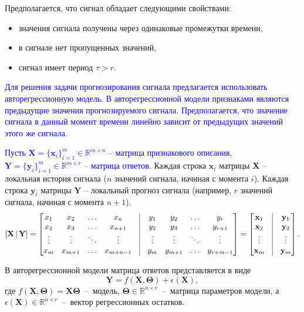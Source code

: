 \documentclass[12pt,twoside]{article}
\newcommand{\bx}{\mathbf{x}}
\newcommand{\by}{\mathbf{y}}
\newcommand{\bTheta}{\boldsymbol{\Theta}}
\begin{document}
Предполагается, что сигнал обладает следующими свойствами: 

\begin{itemize}
\item значения сигнала получены через одинаковые промежутки времени, 
\item в сигнале нет пропущенных значений,
\item сигнал имеет период $\tau > r$. 
\end{itemize}
\textcolor{blue}{Для решения задачи прогнозирования сигнала предлагается использовать авторегрессионную модель. 
В авторегрессионной модели признаками являются предыдущие значения прогнозируемого сигнала. Предполагается, что значение сигнала в данный момент времени линейно зависит от предыдущих значений этого же сигнала.} 

\textcolor{blue}{Пусть $\mathbf{X} = \{\bx_i\}_{i=1}^m \in \mathbb{R}^{m \times n}$ -- матрица признакового описания, $\mathbf{Y}= \{\by_i\}_{i=1}^m \in \mathbb{R}^{m \times r}$ -- матрица ответов.} Каждая строка $\bx_i$ матрицы $\mathbf{X}$ – локальная история сигнала ($n$ значений сигнала, начиная с момента $i$). Каждая строка $\by_i$ матрицы $\mathbf{Y}$ – локальный прогноз сигнала (например, $r$ значений сигнала, начиная с момента $n+1$).
$$\left[ \mathbf{X \, | \, Y} \right] = \begin{bmatrix}
        x_1 & x_2 & \dots  & x_{n} & \vrule & y_1 & y_2 & \dots  & y_{r}\\
        x_2 & x_3 & \dots & x_{n + 1} & \vrule & y_2 & y_3 & \dots  & y_{r+1}\\
        \vdots & \vdots & \ddots & \vdots & \vrule & \vdots & \vdots & \ddots & \vdots \\
        x_{m} & x_{m+1} & \dots  & x_{m+n-1} & \vrule & y_{m} & y_{m+1} & \dots  & y_{r+m-1}
    \end{bmatrix} = 
    \begin{bmatrix}
        \bx_1 & \vrule & \by_1\\
        \bx_2 &\vrule & \by_2\\
        \vdots & \vrule &  \vdots \\
        \bx_m & \vrule & \by_m
    \end{bmatrix}.
$$

В авторегрессионной модели матрица ответов представляется в виде $$\mathbf{Y} = f (\mathbf{X},  \bTheta) + \epsilon ( \mathbf{X} ), $$ 
где  $f (\mathbf{X},  \bTheta) = \mathbf{X} \bTheta$~--~модель, $\bTheta \in \mathbb{R}^{n \times r}$~--~матрица параметров модели, а~$\epsilon(\mathbf{X})\in \mathbb{R}^{n \times r}$~--~вектор регрессионных остатков.
\end{document}
